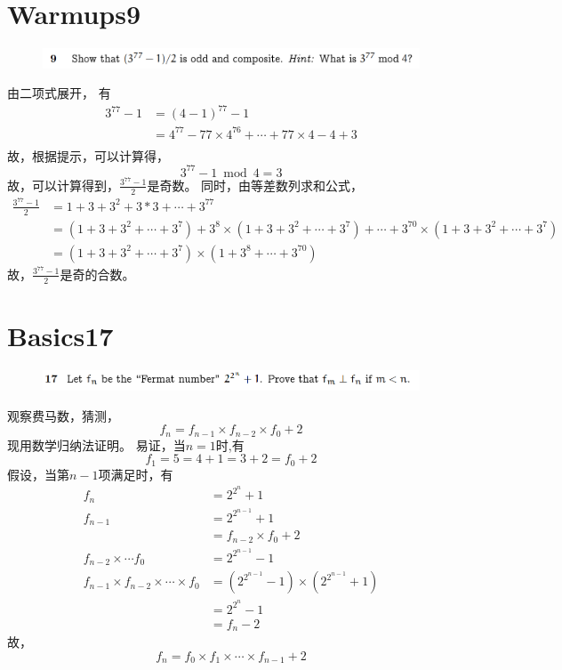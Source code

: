 \documentclass[]{article}
\begin{document}
\section*{Warmups9}
\begin{figure}[H]
	\includegraphics[scale = 1]{Q3}
\end{figure}
由二项式展开，
有
\begin{align}
	3^{77}-1&=(4-1)^{77}-1\\
	&=4^{77} - 77 \times 4^{76} + \cdots + 77 \times 4 - 4 + 3 \\
\end{align}
故，根据提示，可以计算得，
\begin{equation}
	3^{77} -1 \bmod 4 = 3
\end{equation}
故，可以计算得到，$\frac{3^{77}-1}{2}$是奇数。
同时，由等差数列求和公式，
\begin{align}
	\frac{3^{77}-1}{2} &= 1 + 3+ 3^2 + 3*3 +\cdots + 3^{77}\\
	&= (1+3+3^2 + \cdots + 3^7) + 3^8 \times (1+3+3^2 + \cdots + 3^7) + \cdots + 3^{70} \times (1+3+3^2 + \cdots + 3^7)\\
	& = (1+3+3^2 + \cdots + 3^7) \times (1 + 3^8 + \cdots + 3^{70})
\end{align}
故，$\frac{3^{77}-1}{2}$是奇的合数。

\section*{Basics17}
\begin{figure}[H]
	\includegraphics[scale = 1]{Q4}
\end{figure}
观察费马数，猜测，
\begin{equation}
	f_{n} = f_{n-1} \times f_{n-2} \times f_{0} + 2
\end{equation}
现用数学归纳法证明。
易证，当$n=1$时,有
\begin{equation}
	f_{1} = 5 = 4 + 1 = 3 +2=f_{0} + 2
\end{equation}
假设，当第$n-1$项满足时，有
\begin{align}
	f_{n} &= 2^{2^n} + 1\\
	f_{n-1} &= 2^{2^{n-1}} + 1 \\
	&=f_{n-2} \times f_{0} + 2\\
	f_{n-2} \times \cdots f_{0} &= 2^{2^{n-1}} -1 \\
	f_{n-1} \times f_{n-2} \times \cdots \times f_{0} &= (2^{2^{n-1}} -1)\times (2^{2^{n-1}}+1)\\
	&=2^{2^{n}} - 1\\
	&=f_{n} - 2
\end{align}
故，
\begin{equation}
	f_{n} = f_{0} \times f_{1} \times \cdots \times f_{n-1} + 2
\end{equation}
\end{document}
